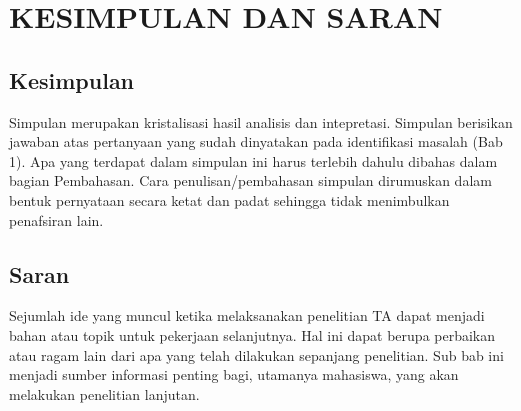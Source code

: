 \chapter{KESIMPULAN DAN SARAN}

\section{Kesimpulan}
Simpulan merupakan kristalisasi hasil analisis dan intepretasi. Simpulan berisikan jawaban atas pertanyaan yang sudah dinyatakan pada identifikasi masalah (Bab 1). Apa yang terdapat dalam simpulan ini harus terlebih dahulu dibahas dalam bagian Pembahasan. Cara penulisan/pembahasan simpulan dirumuskan dalam bentuk pernyataan secara ketat dan padat sehingga tidak menimbulkan penafsiran lain.

\section{Saran}
Sejumlah ide yang muncul ketika melaksanakan penelitian TA dapat menjadi bahan atau topik untuk pekerjaan selanjutnya. Hal ini dapat berupa perbaikan atau ragam lain dari apa yang telah dilakukan sepanjang penelitian. Sub bab ini menjadi sumber informasi penting bagi, utamanya mahasiswa, yang akan melakukan penelitian lanjutan.